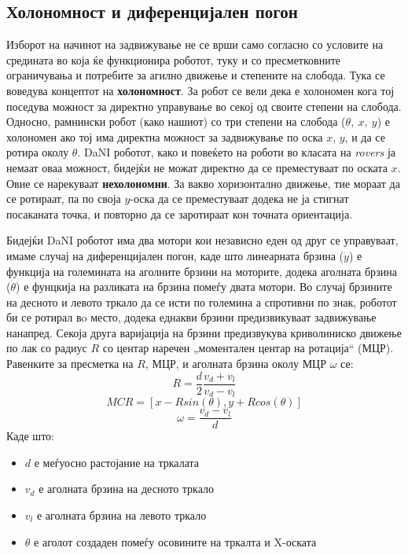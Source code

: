 \documentclass[12pt]{article}
\begin{document}
    \subsection{Холономност и диференцијален погон}
      Изборот на начинот на задвижување не се врши само согласно со условите на средината во која ќе функционира роботот, туку и со пресметковните ограничувања и потребите за агилно движење и степените на слобода. Тука се воведува концептот на \textbf{холономност}. За робот се вели дека е холономен кога тој поседува можност за директно управување во секој од своите степени на слобода. Односно, рамнински робот (како нашиот) со три степени на слобода ($\theta,\ x,\ y$) е холономен ако тој има директна можност за задвижување по оска $x$, $y$, и да се ротира околу $\theta$. DaNI роботот, како и повеќето на роботи во класата на \textit{rovers} ја немаат оваа можност, бидејќи не можат директно да се преместуваат по оската $x$. Овие се нарекуваат \textbf{нехолономни}. За вакво хоризонтално движење, тие мораат да се ротираат, па по своја $y$-оска да се преместуваат додека не ја стигнат посаканата точка, и повторно да се заротираат кон точната ориентација.

      Бидејќи DaNI роботот има два мотори кои независно еден од друг се управуваат, имаме случај на диференцијален погон, каде што линеарната брзина ($\dot y$) е функција на големината на аголните брзини на моторите, додека аголната брзина ($\dot \theta$) е фунцкија на разликата на брзина помеѓу двата мотори. Во случај брзините на десното и левото тркало да се исти по големина а спротивни по знак, роботот би се ротирал вo место, додека еднакви брзини предизвикуваат задвижување нанапред. Секоја друга варијација на брзини предизвукува криволиниско движење по лак со радиус $R$ со центар наречен „моментален центар на ротација“ (МЦР). Равенките за пресметка на $R$, МЦР, и аголната брзина околу МЦР $\omega$ се:
      $$ R = \frac{d}{2} \frac{v_d + v_l}{v_d - v_l} $$
      $$ {MCR} = [x - Rsin(\theta), y + Rcos(\theta)] $$
      $$ \omega = \frac{v_d - v_l}{d} $$
      Каде што:
      \begin{itemize}
        \item $d$ е меѓуосно растојание на тркалата
        \item $v_d$ е аголната брзина на десното тркало
        \item $v_l$ е аголната брзина на левото тркало
        \item $\theta$ е аголот создаден помеѓу осовините на тркалта и X-оската
      \end{itemize}
\end{document}
